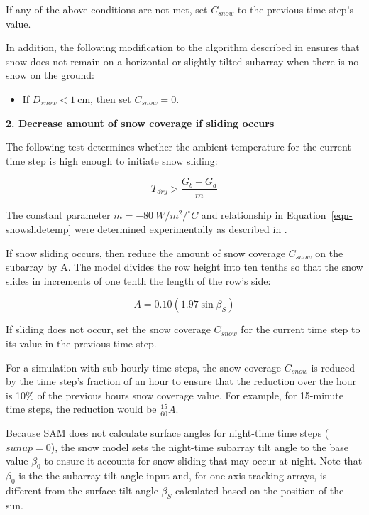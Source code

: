\documentclass[12pt,letterpaper]{article}
\begin{document}
If any of the above conditions are not met, set $C_{snow}$ to the previous time step's value.

In addition, the following modification to the algorithm described in \citet{marion-snowmodel} ensures that snow does not remain on a horizontal or slightly tilted subarray when there is no snow on the ground: 

\begin{itemize}
\item If $D_{snow} < 1~\text{cm}$, then set $C_{snow}=0$.
\end{itemize}

\textbf{2. Decrease amount of snow coverage if sliding occurs}

The following test determines whether the ambient temperature for the current time step is high enough to initiate snow sliding:

\begin{equation}\label{eqn-snowslidetemp}
T_{dry}> \frac{G_{b}+G_{d}}{m}
\end{equation}

The constant parameter $m=-80\ W/m^2/^\circ C$ and relationship in Equation~\ref{eqn-snowslidetemp} were determined experimentally as described in \citet{marion-snowmodel}.

If snow sliding occurs, then reduce the amount of snow coverage $C_{snow}$ on the subarray by A. The model divides the row height into ten tenths so that the snow slides in increments of one tenth the length of the row's side:

\begin{equation}	\label{eqn-snowSlideAmount}
	A = 0.10 \left(1.97  \sin \beta_{S} \right)
\end{equation}

If sliding does not occur, set the snow coverage $C_{snow}$ for the current time step to its value in the previous time step. 

For a simulation with sub-hourly time steps, the snow coverage $C_{snow}$ is reduced by the time step's fraction of an hour to ensure that the reduction over the hour is 10\% of the previous hours snow coverage value. For example, for 15-minute time steps, the reduction would be $\frac{15}{60}A$.

Because SAM does not calculate surface angles for night-time time steps ($sunup = 0$), the snow model sets the night-time subarray tilt angle to the base value $\beta_0$ to ensure it accounts for snow sliding that may occur at night. Note that $\beta_0$ is the the subarray tilt angle input and, for one-axis tracking arrays, is different from the surface tilt angle $\beta_S$ calculated based on the position of the sun.
\end{document}
